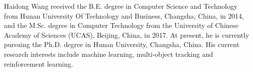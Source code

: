 \documentclass[journal]{IEEEtran}
\begin{document}
% 



%




\begin{IEEEbiography}{Haidong Wang}
	 received the B.E. degree in Computer Science and Technology from Hunan University Of Technology and Business, Changsha, China, in 2014, and the M.Sc. degree in Computer Technology from the University of Chinese Academy of Sciences (UCAS), Beijing, 	China, in 2017. At present, he is currently pursuing the Ph.D. degree in Hunan University, Changsha, China. His current research interests include machine learning,  multi-object tracking and reinforcement learning.
\end{IEEEbiography}
\end{document}
